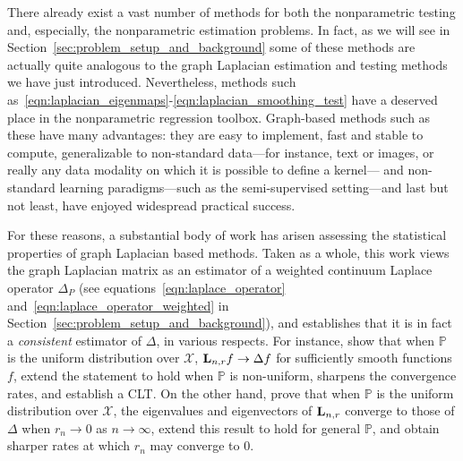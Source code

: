 \documentclass{article}
\newcommand{\1}{\mathbf{1}}
\newcommand{\Lap}{{\bf L}}
\newcommand{\Xset}{\mathcal{X}}
\newcommand{\Pbb}{\mathbb{P}}
\theoremstyle{alden}
\theoremstyle{aldenthm}
\theoremstyle{definition}
\theoremstyle{remark}
\begin{document}
There already exist a vast number of methods for both the nonparametric testing and, especially, the nonparametric estimation problems. In fact, as we will see in Section~\ref{sec:problem_setup_and_background} some of these methods are actually quite analogous to the graph Laplacian estimation and testing methods we have just introduced. Nevertheless, methods such as~\eqref{eqn:laplacian_eigenmaps}-\eqref{eqn:laplacian_smoothing_test} have a deserved place in the nonparametric regression toolbox. Graph-based methods such as these have many advantages: they are easy to implement, fast and stable to compute, generalizable to non-standard data---for instance, text or images, or really any data modality on which it is possible to define a kernel--- and non-standard learning paradigms---such as the semi-supervised setting---and last but not least, have enjoyed widespread practical success.

For these reasons, a substantial body of work has arisen assessing the statistical properties of graph Laplacian based methods. Taken as a whole, this work views the graph Laplacian matrix as an estimator of a weighted continuum Laplace operator $\Delta_P$ (see equations~\eqref{eqn:laplace_operator} and~\eqref{eqn:laplace_operator_weighted} in Section~\ref{sec:problem_setup_and_background}), and establishes that it is in fact a \emph{consistent} estimator of $\Delta$, in various respects. For instance,  \citet{belkin03,belkin05} show that when $\Pbb$ is the uniform distribution over $\Xset$, $\Lap_{n,r}f \to \Delta f$ for sufficiently smooth functions $f$, \citet{lafon04,hein05} extend the statement to hold when $\Pbb$ is non-uniform, \citet{singer06} sharpens the convergence rates, and \cite{gine06} establish a CLT. On the other hand, \citet{belkin07} prove that when $\Pbb$ is the uniform distribution over $\mathcal{X}$, the eigenvalues and eigenvectors of $\Lap_{n,r}$ converge to those of $\Delta$ when $r_n \to 0$ as $n \to \infty$, \citet{garciatrillos18} extend this result to hold for general $\Pbb$, and \cite{calder2019} obtain sharper rates at which $r_n$ may converge to $0$. 
\end{document}

